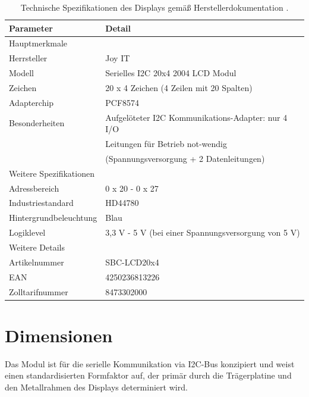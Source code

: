 \begin{table}[h!]
	\caption{Technische Spezifikationen des Displays gemäß Herstellerdokumentation \cite{Simac:2020}.} 
	\begin{center}
		\begin{tabular}{|l|l|}
			\hline
			\textbf{Parameter} &\textbf{Detail} \\
			\hline
			Hauptmerkmale &  	\\
			\hline
			Herrsteller & Joy IT 	\\
			\hline
			Modell & Serielles I2C 20x4 2004 LCD Modul 	\\
			\hline
			Zeichen & 20 x 4 Zeichen (4 Zeilen mit 20 Spalten)	\\
			\hline
			Adapterchip &  PCF8574	\\	
			\hline
			Besonderheiten  & Aufgelöteter I2C Kommunikations-Adapter: nur 4 I/O \\ 
			 & Leitungen für Betrieb not-wendig \\	
			 & (Spannungsversorgung + 2 Datenleitungen) \\	
			\hline
			Weitere Spezifikationen &   	\\	
			\hline
			Adressbereich &   0 x 20 - 0 x 27	\\	
			\hline
			Industriestandard & HD44780	\\	
			\hline
			Hintergrundbeleuchtung  & Blau \\	
			\hline
			Logiklevel & 3,3 V - 5 V (bei einer Spannungsversorgung von 5 V) \\	
			\hline
			Weitere Details &   \\	
			\hline
			Artikelnummer & SBC-LCD20x4 \\	
			\hline
			EAN & 4250236813226 \\
			\hline
			Zolltarifnummer & 8473302000 	\\	
			\hline
			
		\end{tabular}
		\label{JoyIt}
	\end{center}
\end{table} 


\section{Dimensionen}

Das Modul ist für die serielle Kommunikation via I2C-Bus konzipiert und weist einen standardisierten Formfaktor auf, der primär durch die Trägerplatine und den Metallrahmen des Displays determiniert wird.

